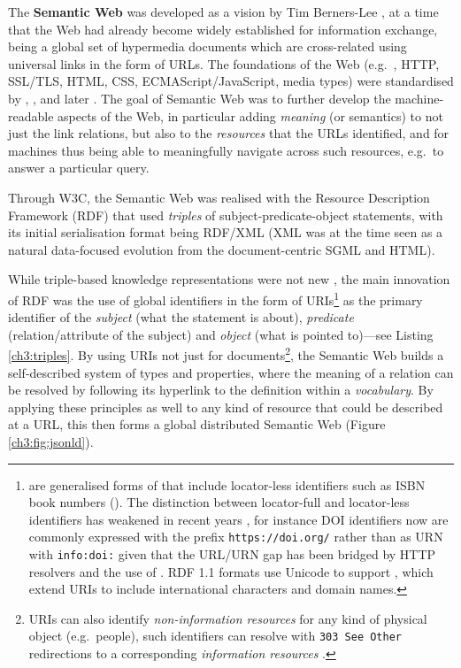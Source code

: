The \textbf{Semantic Web} was developed as a vision by Tim Berners-Lee \cite{Berners-Lee 1999}, at a time that the Web had already become widely established for information exchange, being a global set of hypermedia documents which are cross-related using universal links in the form of URLs. The foundations of the Web (e.g.~, \acrshort{HTTP}, \acrshort{SSL}/\acrshort{TLS}, \acrshort{HTML}, CSS, ECMAScript/JavaScript, media types) were standardised by , ,  and later . The goal of Semantic Web was to further develop the machine-readable aspects of the Web, in particular adding \emph{meaning} (or semantics) to not just the link relations, but also to the \emph{resources} that the URLs identified, and for machines thus being able to meaningfully navigate across such resources, e.g.~to answer a particular query.

Through W3C, the Semantic Web was realised with the Resource Description Framework (RDF) \cite{Schreiber 2014} that used \emph{triples} of subject-predicate-object statements, with its initial serialisation format \cite{Lassila 1999} being RDF/XML (XML was at the time seen as a natural data-focused evolution from the document-centric SGML and HTML).

While triple-based knowledge representations were not new \cite{Stanczyk 1987}, the main innovation of RDF was the use of global identifiers in the form of URIs\footnote{ \cite{Berners-Lee 2005} are generalised forms of  that include locator-less identifiers such as ISBN book numbers ().
The distinction between locator-full and locator-less identifiers has weakened in recent years \cite{OCLC 2010}, for instance \acrshort{DOI} identifiers now are commonly expressed with the prefix \texttt{https://doi.org/} rather than as URN with \texttt{info:doi:} given that the URL/URN gap has been bridged by HTTP resolvers and the use of  \cite{Juty 2011}.
RDF 1.1 formats use Unicode to support  \cite{Dürst 2005}, which extend URIs to include international characters and domain names.} as the primary identifier of the \emph{subject} (what the statement is about), \emph{predicate} (relation/attribute of the subject) and \emph{object} (what is pointed to)---see Listing \vref{ch3:triples}.
By using URIs not just for documents\footnote{URIs can also identify \emph{non-information resources} for any kind of physical object (e.g.~people), such identifiers can resolve with \texttt{303\ See\ Other} redirections to a corresponding \emph{information resources} \cite{Sauermann 2008}.}, the Semantic Web builds a self-described system of types and properties, where the meaning of a relation can be resolved by following its hyperlink to the definition within a \emph{vocabulary}. By applying these principles as well to any kind of resource that could be described at a URL, this then forms a global distributed Semantic Web (Figure \vref{ch3:fig:jsonld}).


